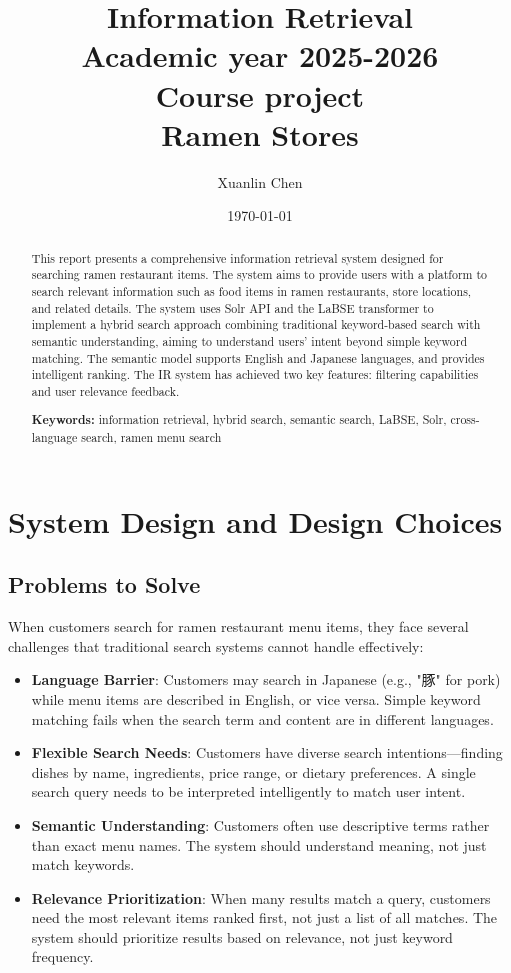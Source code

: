 \documentclass[11pt,a4paper]{article}
\title{\textbf{Information Retrieval}\\
Academic year 2025-2026\\
Course project\\
Ramen Stores}
\author{Xuanlin Chen}
\date{\today}
\begin{document}
\maketitle

\begin{abstract}
This report presents a comprehensive information retrieval system designed for searching ramen restaurant items. The system aims to provide users with a platform to search relevant information such as food items in ramen restaurants, store locations, and related details. The system uses Solr API and the LaBSE transformer to implement a hybrid search approach combining traditional keyword-based search with semantic understanding, aiming to understand users' intent beyond simple keyword matching. The semantic model supports English and Japanese languages, and provides intelligent ranking. The IR system has achieved two key features: filtering capabilities and user relevance feedback.

\textbf{Keywords:} information retrieval, hybrid search, semantic search, LaBSE, Solr, cross-language search, ramen menu search
\end{abstract}

\tableofcontents
\newpage

\section{System Design and Design Choices}

\subsection{Problems to Solve}

When customers search for ramen restaurant menu items, they face several challenges that traditional search systems cannot handle effectively:

\begin{itemize}
    \item \textbf{Language Barrier}: Customers may search in Japanese (e.g., "豚" for pork) while menu items are described in English, or vice versa. Simple keyword matching fails when the search term and content are in different languages.
    
    \item \textbf{Flexible Search Needs}: Customers have diverse search intentions—finding dishes by name, ingredients, price range, or dietary preferences. A single search query needs to be interpreted intelligently to match user intent.
    
    \item \textbf{Semantic Understanding}: Customers often use descriptive terms rather than exact menu names. The system should understand meaning, not just match keywords.
    
    \item \textbf{Relevance Prioritization}: When many results match a query, customers need the most relevant items ranked first, not just a list of all matches. The system should prioritize results based on relevance, not just keyword frequency.
\end{itemize}
\end{document}
